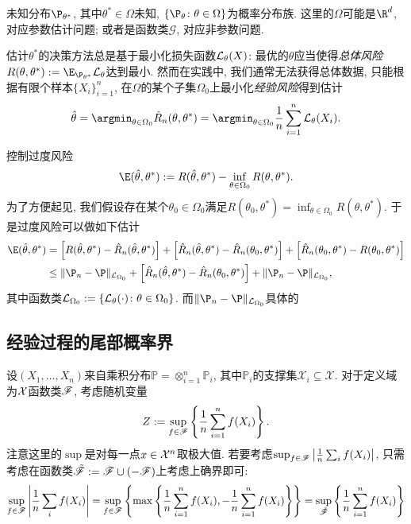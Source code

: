未知分布$\P_{\theta^*}$, 其中$\theta^* \in \Omega$未知, $\{ \P_{\theta} \colon \theta \in \Omega\}$为概率分布族. 
这里的$\Omega$可能是$\R^d$, 对应参数估计问题; 或者是函数类$\mathscr{G}$, 对应非参数问题. 

估计$\theta^*$的决策方法总是基于最小化损失函数$\mathcal{L}_{\theta} (X)$: 最优的$\theta$应当使得\emph{总体风险}$R(\theta, \theta^*) := \E_{\P_{\theta^*}}\cL_{\theta}$达到最小. 
然而在实践中, 我们通常无法获得总体数据, 只能根据有限个样本$\{ X_i \}_{i=1}^n$, 在$\Omega$的某个子集$\Omega_0$上最小化\emph{经验风险}得到估计
\begin{equation*}
	\hat \theta 
	= \argmin_{\theta \in \Omega_0} \hat R_n (\theta, \theta^*) 
	= \argmin_{\theta \in \Omega_0} \frac{1}{n} \sum_{i=1}^n \cL_{\theta}(X_i). 
\end{equation*}


控制过度风险
\begin{equation*}
	\E(\hat \theta, \theta^*)
	:= R(\hat \theta, \theta^*) - \inf_{\theta \in \Omega_0} R(\theta, \theta^*). 
\end{equation*}
为了方便起见, 我们假设存在某个$\theta_0 \in \Omega_0$满足$R(\theta_0, \theta^*) = \inf_{\theta \in \Omega_0}R(\theta, \theta^*)$. 
于是过度风险可以做如下估计
\begin{align*}
	\E(\hat \theta, \theta^*)
	&= \left[ R(\hat \theta, \theta^*) - \hat R_n(\hat \theta, \theta^*) \right] 
	+ \left[ \hat R_n(\hat \theta, \theta^*) - \hat R_n(\theta_0, \theta^*) \right]
	+ \left[ \hat R_n(\theta_0, \theta^*) - R(\theta_0, \theta^*) \right] \\
	&\leq \|\P_n - \P\|_{\cL_{\Omega_0}} 
	+ \left[ \hat R_n(\hat \theta, \theta^*) - \hat R_n(\theta_0, \theta^*) \right]
	+ \|\P_n - \P\|_{\cL_{\Omega_0}}, 
\end{align*}
其中函数类$\mathcal{L}_{\Omega_0} := \{ \mathcal{L}_{\theta}(\cdot) \colon \theta \in \Omega_0 \}$. 
而$\|\P_n - \P\|_{\cL_{\Omega_0}}$具体的




\subsection{经验过程的尾部概率界}

设$(X_1, \dots, X_n)$来自乘积分布$\mathbb{P} = \otimes_{i=1}^n \mathbb{P}_i$, 其中$\mathbb{P}_i$的支撑集$\mathcal{X}_i \subseteq \mathcal{X}$. 
对于定义域为$\mathcal{X}$函数类$\mathscr{F}$, 考虑随机变量
\begin{equation*}
	Z := \sup_{f \in \mathscr{F}} \left\{ \frac{1}{n} \sum_{i=1}^n f(X_i) \right\}. 
\end{equation*}
注意这里的$\sup$是对每一点$x \in \mathcal{X}^n$取极大值. 
若要考虑$\sup_{f \in \mathscr{F}} \left| \frac{1}{n} \sum_i f(X_i) \right|$, 只需考虑在函数类$\tilde {\mathscr{F}} := \mathscr{F} \cup (- \mathscr{F})$上考虑上确界即可: 
\begin{equation*}
	\sup_{f \in \mathscr{F}} \left| \frac{1}{n} \sum_i f(X_i) \right|
	= \sup_{f \in \mathscr{F}} \left\{ \max \left\{ \frac{1}{n} \sum_{i=1}^n f(X_i), - \frac{1}{n} \sum_{i=1}^n f(X_i) \right\} \right\} 
	= \sup_{\tilde {\mathscr{F}}} \left\{ \frac{1}{n} \sum_{i=1}^n f(X_i) \right\}
\end{equation*}


